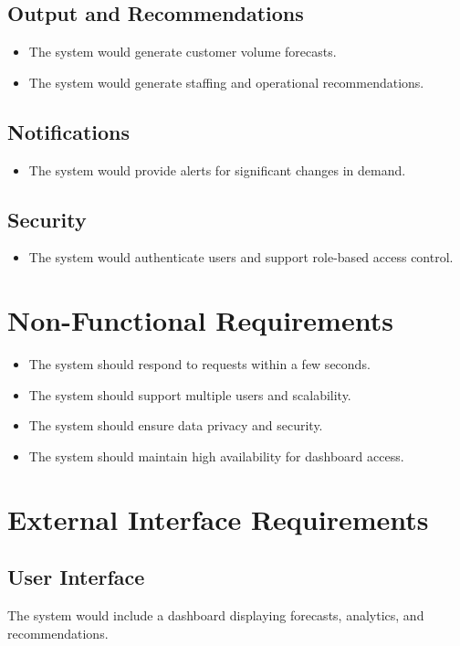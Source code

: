 \documentclass[12pt]{report}
\begin{document}
\subsection{Output and Recommendations}
\begin{itemize}
    \item  The system would generate customer volume forecasts.
     \item The system would generate staffing and operational recommendations.
\end{itemize}

\subsection{Notifications}
\begin{itemize}
    \item The system would provide alerts for significant changes in demand.
\end{itemize}

\subsection{Security}
\begin{itemize}
    \item The system would authenticate users and support role-based access control.
\end{itemize}


\section{Non-Functional Requirements}

\begin{itemize}
    \item The system should respond to requests within a few seconds.
    \item The system should support multiple users and scalability.
    \item The system should ensure data privacy and security.
    \item The system should maintain high availability for dashboard access.
\end{itemize}


\section{External Interface Requirements}

\subsection{User Interface}
The system would include a dashboard displaying forecasts, analytics, and recommendations.
\end{document}
